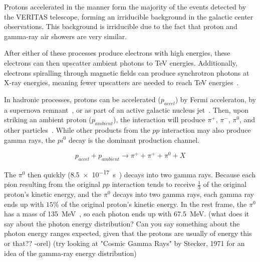 

  Protons accelerated in the manner form the majority of the events detected by the VERITAS telescope, forming an irriducible background in the galactic center observations.
  This background is irriducible due to the fact that proton and gamma-ray air showers are very similar.
  
  After either of these processes produce electrons with high energies, these electrons can then upscatter ambient photons to TeV energies.
  Additionally, electrons spiralling through magnetic fields can produce synchrotron photons at X-ray energies, meaning fewer upscatters are needed to reach TeV energies~\cite{self_compton}.

  In hadronic processes, protons can be accelerated ($p_{accel}$) by Fermi acceleraton, by a supernova remnant~\cite{proton_snr_accel}, or as part of an active galactic nucleus jet~\cite{hadronic1,hadronic2}.
  Then, upon striking an ambient proton ($p_{ambient}$), the interaction will produce $\pi^{+}$, $\pi^{-}$, $\pi^{0}$, and other particles~\cite{pp_pion,pp_pion2,pp_pion3}.
  While other products from the $pp$ interaction may also produce gamma rays, the $pi^0$ decay is the dominant production channel.
  
  \begin{equation}\nonumber
    p_{accel} + p_{ambient} \rightarrow \pi^+ + \pi^+ + \pi^0 + X
  \end{equation}

  The $\pi^{0}$ then quickly (\SI{8.5e-17}{s}~\cite{pdg2016}) decays into two gamma rays.
  Because each pion resulting from the original $pp$ interaction tends to receive $\frac{1}{3}$ of the original proton's kinetic energy, and the $\pi^0$ decays into two gamma rays, each gamma ray ends up with \nicetilde$15\%$ of the original proton's kinetic energy.
  In the rest frame, the $\pi^0$ has a mass of \SI{135}{\MeV}~\cite{pdg2016}, so each photon ends up with \SI{67.5}{\MeV}.
  {\color{red}(what does it say about the photon energy distribution? Can you say something about the photon energy ranges expected, given that the protons are usually of energy this or that?? -orel) (try looking at "Cosmic Gamma Rays" by Stecker, 1971 for an idea of the gamma-ray energy distribution)}
  
